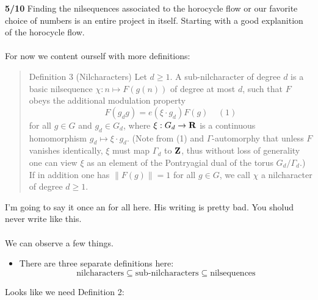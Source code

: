 \documentclass[12pt]{article}
\begin{document}
\noindent \textbf{5/10} Finding the nilsequences associated to the horocycle flow or our favorite choice of numbers is an entire project in itself.  Starting with a good explanition of the horocycle flow. \\ \\
For now we content ourself with more definitions:
\begin{quotation}\noindent
{\color{black!50!white}Definition 3} (Nilcharacters) Let ${d \geq 1}$. A sub-nilcharacter of degree ${d}$ is a basic nilsequence ${\chi: n \mapsto F(g(n))}$ of degree at most ${d}$, such that ${F}$ obeys the additional modulation property
$$\displaystyle F( g_d g ) = e( \xi \cdot g_d ) F(g) \ \ \ \ \ (1)$$
for all ${g \in G}$ and ${g_d \in G_d}$, where ${\xi: G_d \rightarrow {\bf R}}$ is a continuous homomorphism ${g_d \mapsto \xi \cdot g_d}$. (Note from (1) and ${\Gamma}$-automorphy that unless ${F}$ vanishes identically, ${\xi}$ must map ${\Gamma_d}$ to ${{\bf Z}}$, thus without loss of generality one can view ${\xi}$ as an element of the Pontryagial dual of the torus ${G_d / \Gamma_d}$.) If in addition one has ${\|F(g)\|=1}$ for all ${g \in G}$, we call ${\chi}$ a nilcharacter of degree ${d \geq 1}$.
\end{quotation}
I'm going to say it once an for all here.  His writing is pretty bad.  You sholud never write like this.   \\ \\
We can observe a few things. 
\begin{itemize}
\item  There are three separate definitions here:
$$ \text{nilcharacters} \subseteq \text{sub-nilcharacters} \subseteq \text{nilsequences}$$
\end{itemize}
Looks like we need Definition 2:
\end{document}
